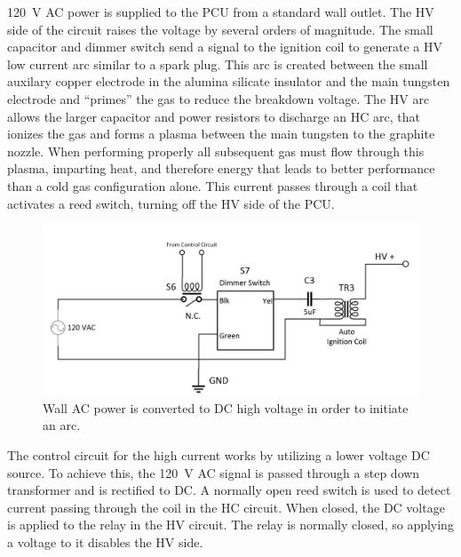 \documentclass[conference]{IEEEtran}
\begin{document}
\SI{120}{\volt} AC power is supplied to the PCU from a standard wall outlet.
The HV side of the circuit raises the voltage by several orders of magnitude.
The small capacitor and dimmer switch send a signal to the ignition coil to generate a HV low current arc similar to a spark plug.
This arc is created between the small auxilary copper electrode in the alumina silicate insulator and the main tungsten electrode and ``primes'' the gas to reduce the breakdown voltage.
The HV arc allows the larger capacitor and power resistors to discharge an HC arc, that ionizes the gas and forms a plasma between the main tungsten to the graphite nozzle.
When performing properly all subsequent gas must flow through this plasma, imparting heat, and therefore energy that leads to better performance than a cold gas configuration alone.
This current passes through a coil that activates a reed switch, turning off the HV side of the PCU.\@

\begin{figure}[htp]
  \includegraphics[width=\linewidth]{figs/hv-schematic.png}
  \caption{Wall AC power is converted to DC high voltage in order to initiate an arc.
\label{fig:hv-circuit}
}
\end{figure}

The control circuit for the high current works by utilizing a lower voltage DC source.
To achieve this, the \SI{120}{\volt} AC signal is passed through a step down transformer and is rectified to DC.\@
A normally open reed switch is used to detect current passing through the coil in the HC circuit.
When closed, the DC voltage is applied to the relay in the HV circuit.
The relay is normally closed, so applying a voltage to it disables the HV side.
\end{document}
